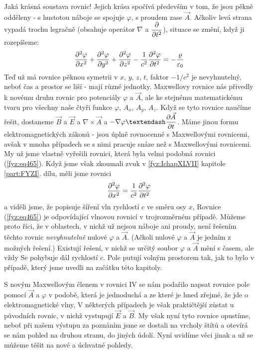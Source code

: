   Jaká krásná soustava rovnic! Jejich krása spočívá především v tom, že jsou pěkně odděleny - s 
  hustotou náboje se spojuje \(\varphi\), s proudem zase \(\vec{A}\). Ačkoliv levá strana vypadá 
  trochu legračně (obsahuje operátor \(\nabla\) a \(\dfrac{\partial }{\partial t^2}\)), situace se změní, když ji 
  rozepíšeme:
  \begin{equation}\label{fyz:eq465}
    \dfrac{\partial^2 \varphi}{\partial x^2} + \dfrac{\partial^2 \varphi}{\partial y^2} + \dfrac{\partial^2 \varphi}{\partial z^2} - \frac{1}{c^2}\dfrac{\partial^2 \varphi}{\partial t^2}
      = - \frac{\varrho}{\varepsilon_0}
  \end{equation} 
  Teď už má rovnice pěknou symetrii v \(x\), \(y\), \(z\), \(t\), faktor \(-1/c^2\) je 
  nevyhnutelný, neboť čas a prostor se liší - mají různé jednotky. Maxwellovy rovnice nás přivedly 
  k novému druhu rovnic pro potenciály \(\varphi\) a \(\vec{A}\), ale ke stejnému matematickému 
  tvaru pro všechny naše čtyři funkce \(\varphi\), \(A_x\), \(A_y\), \(A_z\). Když se tyto rovnice 
  naučíme řešit, dostaneme \(\vec{B}\) a \(\vec{E}\) a \(\nabla\times\vec{A}\) a \(-\nabla\varphi – 
  \pder{\vec{A}}{t}\). Máme jinou formu elektromagnetických zákonů - jsou úplně rovnocenné s 
  Maxwellovými rovnicemi, avšak v mnoha případech se s nimi pracuje snáze než s Maxwellovými 
  rovnicemi. My už jsme vlastně vyřešili rovnici, která byla velmi podobná rovnici 
  (\ref{fyz:eq465}). Když jsme však zkoumali zvuk v \ref{fyz:IchapXLVII} kapitole \ref{part:FYZI}. 
  dílu, měli jsme rovnici
  \begin{equation*}
    \dfrac{\partial^2 \varphi}{\partial x^2} = \frac{1}{c^2}\dfrac{\partial^2 \varphi}{\partial t^2}
  \end{equation*} 
  a viděli jsme, že popisuje šíření vln rychlostí \(c\) ve směru osy \(x\), Rovnice 
  (\ref{fyz:eq465}) je odpovídající vlnovou rovnicí v trojrozměrném případě. Můžeme proto říci, že 
  v oblastech, v nichž už nejsou náboje ani proudy, není řešením těchto rovnic \emph{nevyhnutelně} 
  nulové \(\varphi\) a \(\vec{A}\). (Ačkoli nulové \(\varphi\) a \(\vec{A}\) je jedním z možných 
  řešení.) Existují řešení, v nichž se určitý soubor \(\varphi\) a \(\vec{A}\) mění s časem, ale 
  vždy Se pohybuje dál rychlostí \(c\). Pole putují volným prostorem tak, jak to bylo v případě, 
  který jsme uvedli na začátku této kapitoly.
  
  S novým Maxwellovým členem v rovnici IV se nám podařilo napsat rovnice pole pomocí \(\vec{A}\) a 
  \(\varphi\) v podobě, která je jednoduchá a ze které je hned zřejmé, že jde o elektromagnetické 
  vlny, V některých případech je však praktičtější zůstat u původních rovnic, v nichž vystupují 
  \(\vec{E}\) a \(\vec{B}\). My však nyní tyto rovnice opustíme, neboť při našem výstupu za 
  poznáním jsme se dostali na vrcholy štítů a otevírá se nám pohled na druhou stranu, do jiných 
  údolí. Nyní uvidíme věci jinak a už se můžeme těšit na nové a úchvatné pohledy.

  
\printbibliography[title={Seznam literatury}, heading=subbibliography]
